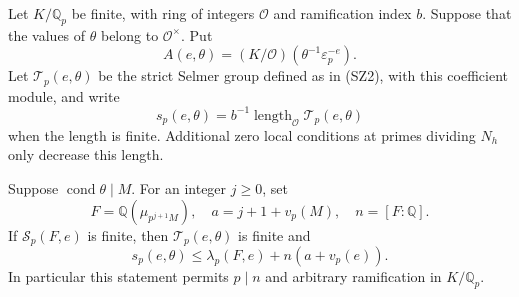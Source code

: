 Let $K/\mathbb Q_p$ be finite, with ring of integers $\mathcal O$
and ramification index $b$. Suppose that the values of
$\theta$ belong to $\mathcal O^\times$. Put
\[
 A(e,\theta)=(K/\mathcal O)(\theta^{-1}\varepsilon_p^{-e}).
                                                               \tag{IV5}
\]
Let $\mathcal T_p(e,\theta)$ be the strict Selmer group defined
as in (SZ2), with this coefficient module, and write
\[
 s_p(e,\theta)=b^{-1}
       \operatorname{length}_{\mathcal O}\mathcal T_p(e,\theta)
                                                               \tag{IV6}
\]
when the length is finite. Additional zero local conditions at
primes dividing $N_h$ only decrease this length.

\begin{lemma}\label{iv-restriction}
Suppose $\operatorname{cond}\theta\mid M$. For an integer
$j\ge0$, set
\[
 F=\mathbb Q(\mu_{p^{j+1}M}),\quad
 a=j+1+v_p(M),\quad n=[F:\mathbb Q].
                                                               \tag{IV7}
\]
If $\mathcal S_p(F,e)$ is finite, then $\mathcal T_p(e,\theta)$
is finite and
\[
             s_p(e,\theta)\le\lambda_p(F,e)+n(a+v_p(e)).
                                                               \tag{IV8}
\]
In particular this statement permits $p\mid n$ and arbitrary
ramification in $K/\mathbb Q_p$.
\end{lemma}
